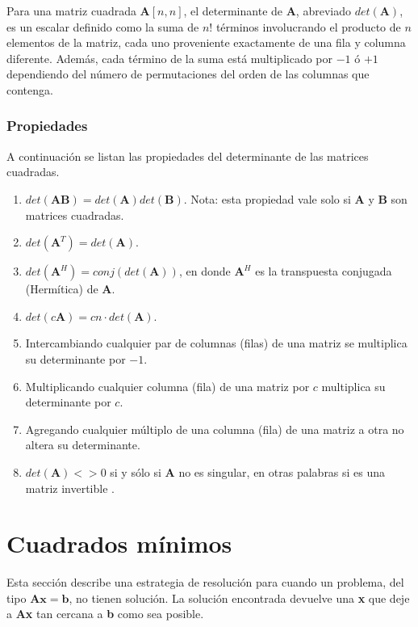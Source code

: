 Para una matriz cuadrada $\mathbf{A}[n,n]$, el determinante de $\mathbf{A}$, abreviado $det(\mathbf{A})$, es un escalar definido
como la suma de $n!$ términos involucrando el producto de $n$ elementos de la matriz, cada uno proveniente exactamente de una 
fila y columna diferente. Además, cada término de la suma está multiplicado por $-1$ ó $+1$ dependiendo del número de 
permutaciones del orden de las columnas que contenga.

\subsubsection{Propiedades}

A continuación se listan las propiedades del determinante de las matrices cuadradas.
\begin{enumerate}
    \item $det(\mathbf{AB}) = det(\mathbf{A})det(\mathbf{B})$. Nota: esta propiedad vale solo si \textbf{A} y \textbf{B} son 
        matrices cuadradas.
    \item $det(\mathbf{A}^T) = det(\mathbf{A})$.
    \item $det(\mathbf{A}^H) = conj(det(\mathbf{A}))$, en donde $\mathbf{A}^H$ es la transpuesta conjugada (Hermítica) de \textbf{A}.
    \item $det(c\mathbf{A}) = cn\cdot det(\mathbf{A})$.
    \item Intercambiando cualquier par de columnas (filas) de una matriz se multiplica su determinante por $-1$.
    \item Multiplicando cualquier columna (fila) de una matriz por $c$ multiplica su determinante por $c$.
    \item Agregando cualquier múltiplo de una columna (fila) de una matriz a otra no altera su determinante.
    \item $det(\mathbf{A}) <> 0$ si y sólo si \textbf{A} no es singular, en otras palabras si es una matriz invertible \cite{MatrixDet}.
\end{enumerate}

\section{Cuadrados mínimos} \label{sec:meanSquare}
Esta sección describe una estrategia de resolución para cuando un problema, del tipo $\mathbf{Ax} = \mathbf{b}$, no tienen solución. 
La solución encontrada devuelve una \textbf{x} que deje a \textbf{Ax} tan cercana a \textbf{b} como sea posible.  

